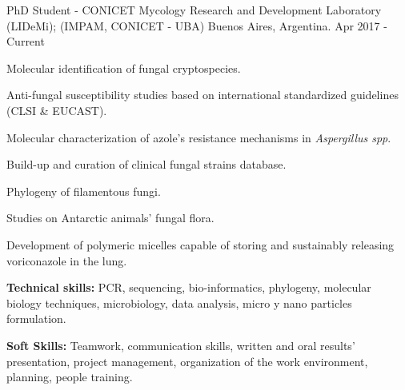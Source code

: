 

\begin{cventries}

  \cventry
    {PhD Student - CONICET} %
    {Mycology Research and Development Laboratory (LIDeMi); (IMPAM, CONICET - UBA)} %
    {Buenos Aires, Argentina.} %
    {Apr 2017 - Current} %
    {
      \begin{cvitems} %
        \item {Molecular identification of fungal cryptospecies.}%
        \item {Anti-fungal susceptibility studies based on international standardized guidelines (CLSI \& EUCAST).}%
        \item {Molecular characterization of azole's resistance mechanisms in \textit{Aspergillus spp}.}%
        \item {Build-up and curation of clinical fungal strains database.}%
        \item {Phylogeny of filamentous fungi.}%
        \item {Studies on Antarctic animals' fungal flora.}%
        \item {Development of polymeric micelles capable of storing and sustainably releasing voriconazole in the lung.}%
        \item {\textbf{Technical skills:} PCR, sequencing, bio-informatics, phylogeny, molecular biology techniques, microbiology, data analysis, micro y nano particles formulation.}%
        \item {\textbf{Soft Skills:} Teamwork, communication skills, written and oral results' presentation, project management, organization of the work environment, planning, people training.}%
      \end{cvitems}%
    }


\end{cventries}
